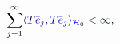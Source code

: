 \documentclass[12pt]{article}
\begin{document}
\makeatletter
\renewcommand*{\@textcolor}[3]{%
  \protect\leavevmode
  \begingroup
    \color#1{#2}#3%
  \endgroup
}
\makeatother
\begin{displaymath}
\mathcolor[RGB]{0,0,15}{\sum} _ { \mathcolor[RGB]{0,0,30}{j} \mathcolor[RGB]{0,0,45}{=} \mathcolor[RGB]{0,0,60}{1} } ^ { \mathcolor[RGB]{0,0,75}{\infty} } \mathcolor[RGB]{0,0,90}{\langle} \mathcolor[RGB]{0,0,105}{T} {\mathcolor[RGB]{0,0,120}{\bar { \mathcolor[RGB]{0,0,135}{e} } }} _ { \mathcolor[RGB]{0,0,150}{j} } \mathcolor[RGB]{0,0,165}{,} \mathcolor[RGB]{0,0,180}{T} {\mathcolor[RGB]{0,0,195}{\bar { \mathcolor[RGB]{0,0,210}{e} } }} _ { \mathcolor[RGB]{0,0,225}{j} } \mathcolor[RGB]{0,0,240}{\rangle} _ { \mathcal { \mathcolor[RGB]{0,0,255}{H} } _ { \mathcolor[RGB]{0,15,0}{0} } } \mathcolor[RGB]{0,15,15}{<} \mathcolor[RGB]{0,15,30}{\infty} \mathcolor[RGB]{0,15,45}{,}
\end{displaymath}
\end{document}
